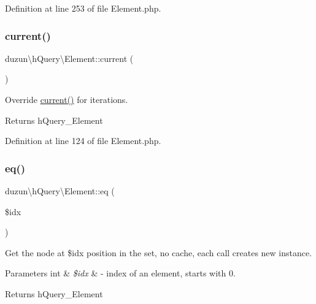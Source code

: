 Definition at line 253 of file Element.\+php.

\mbox{\label{classduzun_1_1hQuery_1_1Element_abef85d8c18394f2c2c1fc25a4f439b55}} 
\subsubsection{\texorpdfstring{current()}{current()}}
{\footnotesize\ttfamily duzun\textbackslash{}h\+Query\textbackslash{}\+Element\+::current (\begin{DoxyParamCaption}{ }\end{DoxyParamCaption})}

Override \mbox{\hyperlink{classduzun_1_1hQuery_1_1Element_abef85d8c18394f2c2c1fc25a4f439b55}{current()}} for iterations.

\begin{DoxyReturn}{Returns}
h\+Query\+\_\+\+Element 
\end{DoxyReturn}


Definition at line 124 of file Element.\+php.

\mbox{\label{classduzun_1_1hQuery_1_1Element_a2d857e83bcbd0d8de4c263b0afc64f43}} 
\subsubsection{\texorpdfstring{eq()}{eq()}}
{\footnotesize\ttfamily duzun\textbackslash{}h\+Query\textbackslash{}\+Element\+::eq (\begin{DoxyParamCaption}\item[{}]{\$idx }\end{DoxyParamCaption})}

Get the node at \$idx position in the set, no cache, each call creates new instance.


\begin{DoxyParams}[1]{Parameters}
int & {\em \$idx} & -\/ index of an element, starts with 0.\\
\hline
\end{DoxyParams}
\begin{DoxyReturn}{Returns}
h\+Query\+\_\+\+Element 
\end{DoxyReturn}


